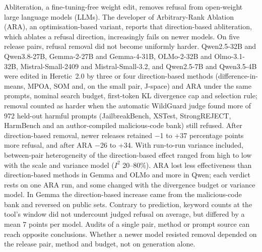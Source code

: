 Abliteration, a fine-tuning-free weight edit, removes refusal from open-weight
large language models (LLMs). The developer of Arbitrary-Rank Ablation (ARA), an
optimisation-based variant, reports that direction-based abliteration, which
ablates a refusal direction, increasingly fails on newer models. On five
release pairs, refusal removal did not become uniformly harder. Qwen2.5-32B and
Qwen3.8-27B, Gemma-2-27B and Gemma-4-31B, OLMo-2-32B and Olmo-3.1-32B,
Mistral-Small-2409 and Mistral-Small-3.2, and Qwen2.5-7B and Qwen3.5-4B were
edited in Heretic~2.0 by three or four direction-based methods
(difference-in-means, MPOA, SOM and, on the small pair, J-space) and ARA under
the same prompts, nominal search budget, first-token KL divergence cap and
selection rule; removal counted as harder when the automatic WildGuard judge
found more of 972 held-out harmful prompts (JailbreakBench, XSTest,
StrongREJECT, HarmBench and an author-compiled malicious-code bank) still
refused. After direction-based removal, newer releases retained $-$1 to +37
percentage points more refusal, and after ARA $-$26 to +34. With run-to-run
variance included, between-pair heterogeneity of the direction-based effect
ranged from high to low with the scale and variance model ($I^2$ 20--80\%).
ARA lost less effectiveness than direction-based methods in Gemma and OLMo and
more in Qwen; each verdict rests on one ARA run, and some changed with the
divergence budget or variance model. In Gemma the direction-based increase came
from the malicious-code bank and reversed on public sets. Contrary to
prediction, keyword counts at the tool's window did not undercount judged
refusal on average, but differed by a mean 7 points per model. Audits of a
single pair, method or prompt source can reach opposite conclusions. Whether a
newer model resisted removal depended on the release pair, method and budget,
not on generation alone.
